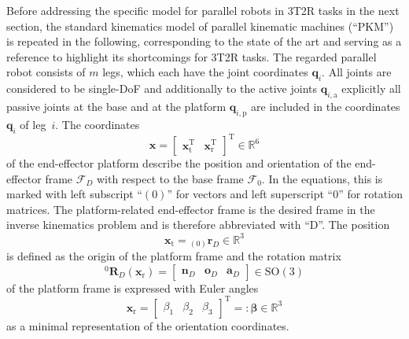 \documentclass[robotics,article,accept,moreauthors,pdftex]{Definitions/mdpi}
\newcommand{\bm}[1]{\boldsymbol{#1}}
\newcommand{\ortvek}[4]{{ }_{(#1)}{\boldsymbol{#2}}^{#3}_{#4} }
\newcommand{\vek}[3]{\boldsymbol{#1}^{#2}_{#3}}
\newcommand{\rotmat}[2]{{{ }^{#1}\boldsymbol{R}}_{#2}}
\newcommand{\transp}[0]{{\mathrm{T}}}
\newcommand{\ks}[1]{{\mathcal{F}}_{#1}}
\begin{document}
Before addressing the specific model for parallel robots in 3T2R tasks in the next section, the standard kinematics model of parallel kinematic machines (``PKM'') is repeated in the following, corresponding to the state of the art \cite{Merlet2006,Gogu2008,BriotKha2015} and serving as a reference to highlight its shortcomings for 3T2R tasks.
The regarded parallel robot consists of $m$ legs, which each have the joint coordinates $\bm{q}_i$.
All joints are considered to be single-DoF and additionally to the active joints $\bm{q}_{i,\mathrm{a}}$ explicitly all passive joints at the base and at the platform $\bm{q}_{i,\mathrm{p}}$ are included in the coordinates $\bm{q}_i$ of leg~$i$.
The coordinates
%
\begin{equation}
\bm{x}
=
\begin{bmatrix}
\bm{x}_{\mathrm{t}}^\transp & \bm{x}_{\mathrm{r}}^\transp
\end{bmatrix}^\transp
\in {\mathbb{R}}^{6}
\label{equ:x_def}
\end{equation}
%
of the end-effector platform describe the position and orientation of the end-effector frame $\ks{D}$ with respect to the base frame $\ks{0}$.
In the equations, this is marked with left subscript ``$(0)$'' for vectors and left superscript ``$0$'' for rotation matrices.
The platform-related end-effector frame is the desired frame in the inverse kinematics problem and is therefore abbreviated with ``D''.
The position 
%
\begin{equation}
\bm{x}_{\mathrm{t}}
=
\ortvek{0}{r}{}{D}
\in {\mathbb{R}}^{3}
\label{equ:xt_def}
\end{equation}
%
is defined as the origin of the platform frame and the rotation matrix
%
\begin{equation}
\rotmat{0}{D} (\bm{x}_{\mathrm{r}})
=
\begin{bmatrix}\vek{n}{}{D} & \vek{o}{}{D} & \vek{a}{}{D}\end{bmatrix} \in \mathrm{SO(3)}
\label{equ:xr_def_rotmat}
\end{equation}
%
of the platform frame is expressed with Euler angles
%
\begin{equation}
\bm{x}_{\mathrm{r}}
=
\begin{bmatrix}
\beta_1 & \beta_2 & \beta_3
\end{bmatrix}^{\mathrm{T}}
=:
\bm{\beta}
\in {\mathbb{R}}^{3}
\label{equ:xr_def}
\end{equation} 
%
as a minimal representation of the orientation coordinates.
\end{document}
